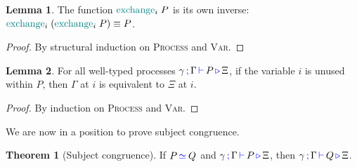 \documentclass[sigplan,10pt,anonymous,review]{acmart}
\theoremstyle{definition}
\newtheorem{nitheorem}{Theorem}
\newtheorem{nilemma}{Lemma}
\newcommand{\type}[1]{\textcolor{blue}{\operatorname{#1}}}
\newcommand{\func}[1]{\textcolor{teal}{\operatorname{#1}}}
\newcommand{\types}[4]{#1 \, \type{;} \, #2 \, \type{\vdash} \, #3 \, \type{\triangleright} \, #4}
\newcommand{\eq}[1]{\, \type{\simeq}_{#1} \,}
\begin{document}
\begin{nilemma}
  \label{lm:exchange-exchange}
  The function $\func{exchange}_i \; P$ is its own inverse: $\func{exchange}_i \; (\func{exchange}_i \; P) \equiv P$.
\end{nilemma}
\begin{proof}
  By structural induction on \textsc{Process} and \textsc{Var}.
\end{proof}

\begin{nilemma}
  \label{lm:types-unused}
  For all well-typed processes $\types{\gamma}{\Gamma}{P}{\Xi}$, if the variable $i$ is unused within $P$, then $\Gamma$ at $i$ is equivalent to $\Xi$ at $i$.
\end{nilemma}
\begin{proof}
  By induction on \textsc{Process} and \textsc{Var}.
\end{proof}

We are now in a position to prove subject congruence.

\begin{nitheorem}[Subject congruence]
  \label{thm:subject-congruence}
  If $P \eq{} Q$ and $\types{\gamma}{\Gamma}{P}{\Xi}$, then $\types{\gamma}{\Gamma}{Q}{\Xi}$.
\end{nitheorem}
\end{document}
